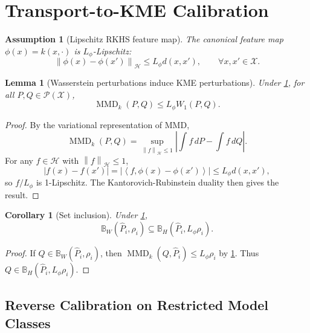 \documentclass[10pt,journal]{IEEEtran}
\newtheorem{assumption}{Assumption}
\newtheorem{lemma}{Lemma}
\newtheorem{corollary}{Corollary}
\DeclareMathOperator{\MMD}{MMD}
\newcommand{\Pcal}{\mathcal{P}}
\newcommand{\Xcal}{\mathcal{X}}
\newcommand{\Hcal}{\mathcal{H}}
\newcommand{\wh}{\widehat}
\newcommand{\norm}[1]{\left\lVert #1 \right\rVert}
\newcommand{\ip}[2]{\left\langle #1,#2 \right\rangle}
\newcommand{\ball}{\mathbb{B}}
\begin{document}
\section{Transport-to-KME Calibration}
\label{sec:calibration}

\begin{assumption}[Lipschitz RKHS feature map]
\label{ass:lipschitz}
The canonical feature map $\phi(x)=k(x,\cdot)$ is $L_\phi$-Lipschitz:
\begin{equation}
    \norm{\phi(x)-\phi(x')}_{\Hcal}\le L_\phi d(x,x'),\qquad \forall x,x'\in\Xcal.
\end{equation}
\end{assumption}

\begin{lemma}[Wasserstein perturbations induce KME perturbations]
\label{lem:w-to-mmd}
Under \cref{ass:lipschitz}, for all $P,Q\in\Pcal(\Xcal)$,
\begin{equation}
\label{eq:w-to-mmd}
    \MMD_k(P,Q)\le L_\phi W_1(P,Q).
\end{equation}
\end{lemma}

\begin{proof}
By the variational representation of MMD,
\begin{equation}
    \MMD_k(P,Q)=\sup_{\norm{f}_{\Hcal}\le 1}\left|\int f\,dP-\int f\,dQ\right|.
\end{equation}
For any $f\in\Hcal$ with $\norm{f}_{\Hcal}\le 1$,
\begin{equation}
    |f(x)-f(x')|=|\ip{f}{\phi(x)-\phi(x')}|\le L_\phi d(x,x'),
\end{equation}
so $f/L_\phi$ is 1-Lipschitz. The Kantorovich-Rubinstein duality then gives the result.
\end{proof}

\begin{corollary}[Set inclusion]
\label{cor:set-inclusion}
Under \cref{ass:lipschitz},
\begin{equation}
    \ball_W(\wh P_i,\rho_i)\subseteq \ball_H(\wh P_i,L_\phi\rho_i).
\end{equation}
\end{corollary}

\begin{proof}
If $Q\in\ball_W(\wh P_i,\rho_i)$, then $\MMD_k(Q,\wh P_i)\le L_\phi\rho_i$ by \cref{lem:w-to-mmd}. Thus $Q\in\ball_H(\wh P_i,L_\phi\rho_i)$.
\end{proof}

\subsection{Reverse Calibration on Restricted Model Classes}
\end{document}
